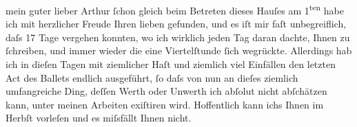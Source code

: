 \pstart{}mein guter lieber Arthur\pend\vspace{0.5em}
\pstart
           ſchon gleich beim Betreten dieses Hauſes am 1\textsuperscript{ten}{ }\label{K_L01149-1v}\label{K_L01149-1} habe ich mit herzlicher Freude Ihren lieben \label{K_L01149-11v}\label{K_L01149-11} gefunden, und es iſt mir
               faſt unbegreiflich, daſs 17 Tage vergehen konnten, wo ich wirklich jeden Tag daran
               dachte, Ihnen zu{ }ſchreiben, und immer wieder die eine Viertelſtunde{ }ſich wegrückte.
               Allerdings hab ich in dieſen Tagen mit ziemlicher Haſt und ziemlich viel Einfällen
               den letzten Act des Ballets
               endlich ausgeführt,{ }ſo daſs von nun an dieſes ziemlich umfangreiche Ding, deſſen
               Werth oder Unwerth ich abſolut nicht abſchätzen kann, unter meinen Arbeiten exiſtiren
               wird. Hoffentlich kann ichs Ihnen im Herbſt vorleſen und es miſsfällt Ihnen
               nicht.\pend
           
